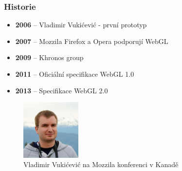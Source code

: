 \documentclass{beamer}
\begin{document}

	\begin{frame}[t,fragile]
		\frametitle{Historie}					
		\begin{itemize}
	    	\item \textbf{2006} – Vladimir Vukićević - první prototyp
			\item \textbf{2007} – Mozzila Firefox a Opera podporují WebGL
			\item \textbf{2009} – Khronos group 
			\item \textbf{2011} – Oficiální specifikace WebGL 1.0
			\item \textbf{2013} – Specifikace WebGL 2.0
		\end{itemize}	
		
		\begin{figure}		
			\includegraphics[width=30mm]{img/vukicevic.jpg}
			\caption{Vladimir Vukićević na Mozzila konferenci v Kanadě}
		\end{figure}
		
	\end{frame}
	
	
\end{document}
